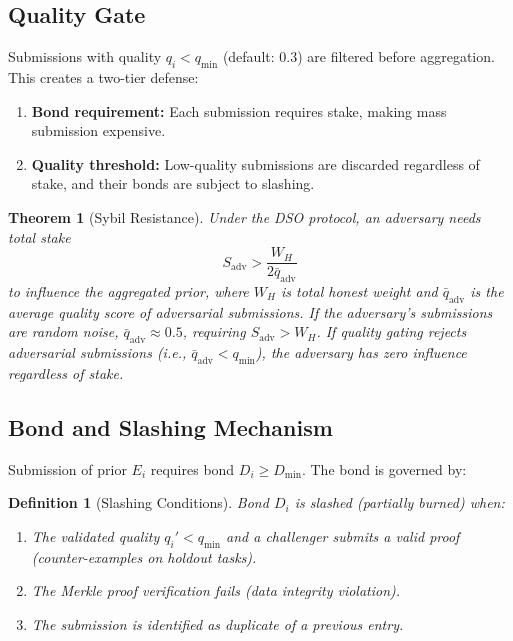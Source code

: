 \documentclass[11pt]{article}
\newtheorem{theorem}{Theorem}
\newtheorem{definition}{Definition}
\begin{document}
\subsection{Quality Gate}

Submissions with quality $q_i < q_{\min}$ (default: 0.3) are filtered before
aggregation. This creates a two-tier defense:

\begin{enumerate}[leftmargin=1.5em]
    \item \textbf{Bond requirement:} Each submission requires stake, making
          mass submission expensive.
    \item \textbf{Quality threshold:} Low-quality submissions are discarded
          regardless of stake, and their bonds are subject to slashing.
\end{enumerate}

\begin{theorem}[Sybil Resistance]
\label{thm:sybil}
Under the DSO protocol, an adversary needs total stake
\begin{equation}
    S_{\text{adv}} > \frac{W_H}{2 \bar{q}_{\text{adv}}}
\end{equation}
to influence the aggregated prior, where $W_H$ is total honest weight and
$\bar{q}_{\text{adv}}$ is the average quality score of adversarial submissions.
If the adversary's submissions are random noise, $\bar{q}_{\text{adv}} \approx 0.5$,
requiring $S_{\text{adv}} > W_H$. If quality gating rejects adversarial
submissions (i.e., $\bar{q}_{\text{adv}} < q_{\min}$), the adversary has zero
influence regardless of stake.
\end{theorem}

\subsection{Bond and Slashing Mechanism}

Submission of prior $E_i$ requires bond $D_i \geq D_{\min}$. The bond is
governed by:

\begin{definition}[Slashing Conditions]
Bond $D_i$ is slashed (partially burned) when:
\begin{enumerate}[leftmargin=1.5em]
    \item The validated quality $q_i' < q_{\min}$ and a challenger submits a
          valid proof (counter-examples on holdout tasks).
    \item The Merkle proof verification fails (data integrity violation).
    \item The submission is identified as duplicate of a previous entry.
\end{enumerate}
\end{definition}
\end{document}
